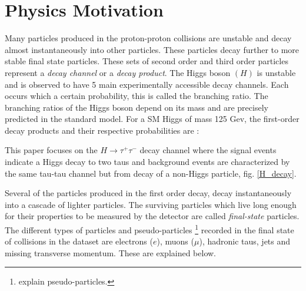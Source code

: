 \documentclass[final,3p,times,twocolumn]{elsarticle}
\begin{document}
\section{Physics Motivation}
\label{physics}
Many particles produced in the proton-proton collisions are unstable and decay almost instantaneously into other particles. These particles decay further to more stable final state particles. These sets of second order and third order particles represent a \textit{decay channel} or a \textit{decay product}. The Higgs boson $(H)$ is unstable and is observed to have 5 main experimentally accessible decay channels. Each occurs which a certain probability, this is called the branching ratio. The branching ratios of the Higgs boson depend on its mass and are precisely predicted in the standard model. For a SM Higgs of mass 125 Gev, the first-order decay products and their respective probabilities are : 


This paper focuses on the  $H \rightarrow \tau^{+} \tau^{-}$ decay channel where the signal events indicate a Higgs decay to two taus and background events are characterized by the same tau-tau channel but from decay of a non-Higgs particle, fig. \ref{H_decay}.  
 
Several of the particles produced in the first order decay, decay instantaneously into a cascade of lighter particles. The surviving particles which live long enough for their properties to be measured by the detector are called \textit{final-state} particles. The different types of particles and pseudo-particles \footnote{explain pseudo-particles.} recorded in the final state of collisions in the dataset are electrons ($e$), muons ($\mu$), hadronic taus, jets and missing transverse momentum. These are explained below. 
\end{document}
